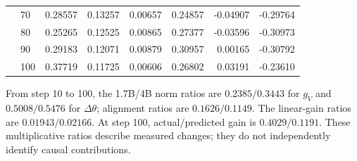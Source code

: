 \begin{table}[!htbp]
\begin{tabular}{llrrrrrr}
 & 70 & 0.28557 & 0.13257 & 0.00657 & 0.24857 & -0.04907 & -0.29764 \\
 & 80 & 0.25265 & 0.12525 & 0.00865 & 0.27377 & -0.03596 & -0.30973 \\
 & 90 & 0.29183 & 0.12071 & 0.00879 & 0.30957 & 0.00165 & -0.30792 \\
 & 100 & 0.37719 & 0.11725 & 0.00606 & 0.26802 & 0.03191 & -0.23610 \\
\bottomrule
\end{tabular}
\medskip
\parbox{\linewidth}{\footnotesize From step 10 to 100, the 1.7B/4B norm ratios are $0.2385/0.3443$ for $g_V$ and $0.5008/0.5476$ for $\Delta\theta$; alignment ratios are $0.1626/0.1149$. The linear-gain ratios are $0.01943/0.02166$. At step 100, actual/predicted gain is $0.4029/0.1191$. These multiplicative ratios describe measured changes; they do not independently identify causal contributions.}
\end{table}

